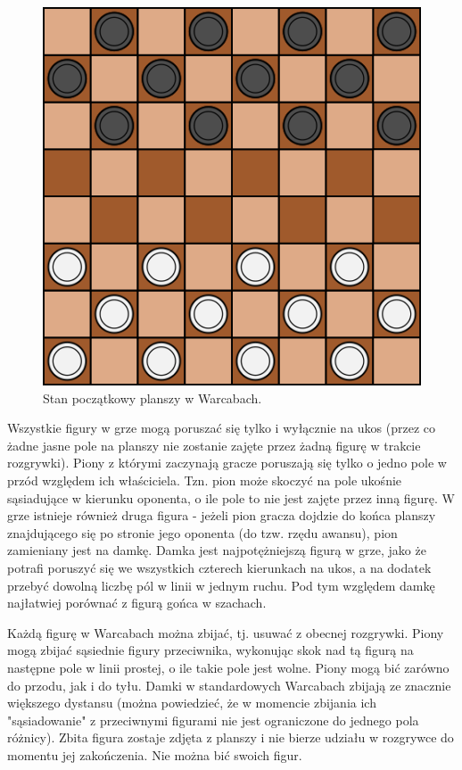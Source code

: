 \begin{figure}[h!]
\centering
\includegraphics[scale=.6]{graphics/warcaby_planszaStartowa.png}
\caption{Stan początkowy planszy w Warcabach.}
\label{fig:plansza}
\end{figure}

\FloatBarrier

Wszystkie figury w grze mogą poruszać się tylko i wyłącznie na ukos (przez co żadne jasne pole na planszy nie zostanie zajęte przez żadną figurę w trakcie rozgrywki). Piony z którymi zaczynają gracze poruszają się tylko o jedno pole w przód względem ich właściciela. Tzn. pion może skoczyć na pole ukośnie sąsiadujące w kierunku oponenta, o ile pole to nie jest zajęte przez inną figurę. W grze istnieje również druga figura - jeżeli pion gracza dojdzie do końca planszy znajdującego się po stronie jego oponenta (do tzw. rzędu awansu), pion zamieniany jest na damkę. Damka jest najpotężniejszą figurą w grze, jako że potrafi poruszyć się we wszystkich czterech kierunkach na ukos, a na dodatek przebyć dowolną liczbę pól w linii w jednym ruchu. Pod tym względem damkę najłatwiej porównać z figurą gońca w szachach.

Każdą figurę w Warcabach można zbijać, tj. usuwać z obecnej rozgrywki. Piony mogą zbijać sąsiednie figury przeciwnika, wykonując skok nad tą figurą na następne pole w linii prostej, o ile takie pole jest wolne. Piony mogą bić zarówno do przodu, jak i do tyłu. Damki w standardowych Warcabach zbijają ze znacznie większego dystansu (można powiedzieć, że w momencie zbijania ich "sąsiadowanie" z przeciwnymi figurami nie jest ograniczone do jednego pola różnicy). Zbita figura zostaje zdjęta z planszy i nie bierze udziału w rozgrywce do momentu jej zakończenia. Nie można bić swoich figur.

